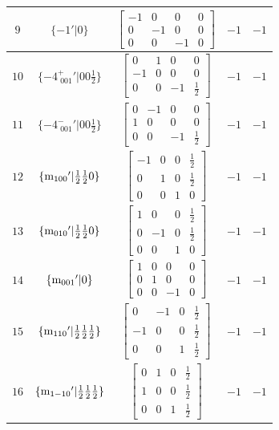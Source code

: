 \documentclass[fleqn,8pt]{jsarticle}
\begin{document}
\begin{longtable}{ccccc}
$ 9 $ & $ \{-1{}'|0\} $ & $ \begin{bmatrix} -1 & 0 & 0 & 0 \\ 0 & -1 & 0 & 0 \\ 0 & 0 & -1 & 0 \end{bmatrix} $ & $ -1 $ & $ -1 $ \\ \hline
$ 10 $ & $ \{-4^{+}_{\,\,001}{}'|0 0 \frac{1}{2}\} $ & $ \begin{bmatrix} 0 & 1 & 0 & 0 \\ -1 & 0 & 0 & 0 \\ 0 & 0 & -1 & \frac{1}{2} \end{bmatrix} $ & $ -1 $ & $ -1 $ \\ \hline
$ 11 $ & $ \{-4^{-}_{\,\,001}{}'|0 0 \frac{1}{2}\} $ & $ \begin{bmatrix} 0 & -1 & 0 & 0 \\ 1 & 0 & 0 & 0 \\ 0 & 0 & -1 & \frac{1}{2} \end{bmatrix} $ & $ -1 $ & $ -1 $ \\ \hline
$ 12 $ & $ \{{\rm m}_{100}{}'|\frac{1}{2} \frac{1}{2} 0\} $ & $ \begin{bmatrix} -1 & 0 & 0 & \frac{1}{2} \\ 0 & 1 & 0 & \frac{1}{2} \\ 0 & 0 & 1 & 0 \end{bmatrix} $ & $ -1 $ & $ -1 $ \\ \hline
$ 13 $ & $ \{{\rm m}_{010}{}'|\frac{1}{2} \frac{1}{2} 0\} $ & $ \begin{bmatrix} 1 & 0 & 0 & \frac{1}{2} \\ 0 & -1 & 0 & \frac{1}{2} \\ 0 & 0 & 1 & 0 \end{bmatrix} $ & $ -1 $ & $ -1 $ \\ \hline
$ 14 $ & $ \{{\rm m}_{001}{}'|0\} $ & $ \begin{bmatrix} 1 & 0 & 0 & 0 \\ 0 & 1 & 0 & 0 \\ 0 & 0 & -1 & 0 \end{bmatrix} $ & $ -1 $ & $ -1 $ \\ \hline
$ 15 $ & $ \{{\rm m}_{110}{}'|\frac{1}{2} \frac{1}{2} \frac{1}{2}\} $ & $ \begin{bmatrix} 0 & -1 & 0 & \frac{1}{2} \\ -1 & 0 & 0 & \frac{1}{2} \\ 0 & 0 & 1 & \frac{1}{2} \end{bmatrix} $ & $ -1 $ & $ -1 $ \\ \hline
$ 16 $ & $ \{{\rm m}_{1-10}{}'|\frac{1}{2} \frac{1}{2} \frac{1}{2}\} $ & $ \begin{bmatrix} 0 & 1 & 0 & \frac{1}{2} \\ 1 & 0 & 0 & \frac{1}{2} \\ 0 & 0 & 1 & \frac{1}{2} \end{bmatrix} $ & $ -1 $ & $ -1 $ \\
\end{longtable}
\end{document}
